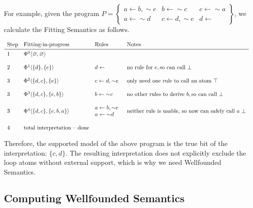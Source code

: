 \documentclass[9pt,a4paper,landscape]{article}
\begin{document}
{For example, given the program $P = \left\{\begin{array}{lll}
a \leftarrow b, {\sim} e & b \leftarrow {\sim} c & c \leftarrow {\sim} a \\
a \leftarrow {\sim} d & c \leftarrow d, {\sim} e & d \leftarrow
\end{array}\right\}$, we calculate the Fitting Semantics as follows.

\begin{center}
	$\begin{array}{llll}
\text{Step} & \text{Fitting-in-progress} & \text{Rules} & \text{Notes} \\ \midrule
1 & \Phi^0 \langle \varnothing, \varnothing \rangle && \\&\\
2 & \Phi^1 \langle \{d\}, \{e\} \rangle & d \leftarrow & \text{no rule for}\ e, \text{so can call}\ \bot\\&\\
3 & \Phi^2 \langle \{d, c\}, \{e\} \rangle & c \leftarrow d, {\sim} e & \text{only need one rule to call an atom}\ \top \\&\\
3 & \Phi^3 \langle \{d, c\}, \{e, b\} \rangle & b \leftarrow {\sim} c & \text{no other rules to derive}\ b, \text{so can call}\ \bot \\&\\
3 & \Phi^4 \langle \{d, c\}, \{e, b, a\} \rangle & \begin{array}{@{}l}
a \leftarrow b, {\sim} e\\
a \leftarrow {\sim} d
\end{array} & \text{neither rule is usable, so now can safely call}\ a\ \bot \\ &\\
4 & \text{total interpretation -- done}
\end{array}$
\end{center}

Therefore, the supported model of the above program is the true bit of the interpretation: $\{c, d\}$.
The resulting interpretation does not explicitly exclude the loop atoms without external support, which is why we need Wellfounded Semantics.


\subsection{Computing Wellfounded Semantics}
\label{subsec:wellf-sem}

}
\end{document}
